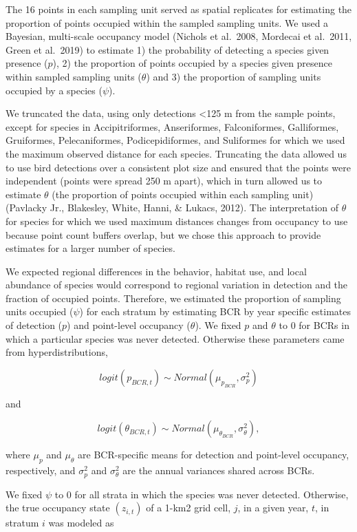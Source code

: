 \documentclass[
  letterpaper,
  DIV=11,
  numbers=noendperiod,
  oneside]{scrreprt}
\begin{document}
The 16 points in each sampling unit served as spatial replicates for
estimating the proportion of points occupied within the sampled sampling
units. We used a Bayesian, multi-scale occupancy model (Nichols et
al.~2008, Mordecai et al.~2011, Green et al.~2019) to estimate 1) the
probability of detecting a species given presence (\(p\)), 2) the
proportion of points occupied by a species given presence within sampled
sampling units (\(θ\)) and 3) the proportion of sampling units occupied
by a species (\(ψ\)).

We truncated the data, using only detections \textless125 m from the
sample points, except for species in Accipitriformes, Anseriformes,
Falconiformes, Galliformes, Gruiformes, Pelecaniformes,
Podicepidiformes, and Suliformes for which we used the maximum observed
distance for each species. Truncating the data allowed us to use bird
detections over a consistent plot size and ensured that the points were
independent (points were spread 250 m apart), which in turn allowed us
to estimate \(θ\) (the proportion of points occupied within each
sampling unit) (Pavlacky Jr., Blakesley, White, Hanni, \& Lukacs, 2012).
The interpretation of \(θ\) for species for which we used maximum
distances changes from occupancy to use because point count buffers
overlap, but we chose this approach to provide estimates for a larger
number of species.

We expected regional differences in the behavior, habitat use, and local
abundance of species would correspond to regional variation in detection
and the fraction of occupied points. Therefore, we estimated the
proportion of sampling units occupied (\(ψ\)) for each stratum by
estimating BCR by year specific estimates of detection (\(p\)) and
point-level occupancy (\(θ\)). We fixed \(p\) and \(θ\) to \(0\) for
BCRs in which a particular species was never detected. Otherwise these
parameters came from hyperdistributions,

\[logit(p_{BCR,t}) \sim Normal(μ_{p_{BCR}},σ_{p}^{2})\]

and

\[logit(θ_{BCR,t})\sim Normal(μ_{θ_{BCR}},σ_{θ}^{2}),\]

where \(μ_{p}\) and \(μ_{θ}\) are BCR-specific means for detection and
point-level occupancy, respectively, and \(σ_{p}^{2}\) and \(σ_{θ}^{2}\)
are the annual variances shared across BCRs.

We fixed \(ψ\) to 0 for all strata in which the species was never
detected. Otherwise, the true occupancy state \((z_{i,t})\) of a 1-km2
grid cell, \(j\), in a given year, \(t\), in stratum \(i\) was modeled
as
\end{document}
